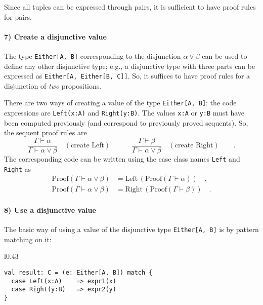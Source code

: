 Since all tuples can be expressed through pairs, it is sufficient
to have proof rules for pairs.

\paragraph{7) Create a disjunctive value}

The type \lstinline!Either[A, B]! corresponding to the disjunction
$\alpha\vee\beta$ can be used to define any other disjunctive type;
e.g., a disjunctive type with three parts can be expressed as \lstinline!Either[A, Either[B, C]]!.
So, it suffices to have proof rules for a disjunction of \emph{two}
propositions.

There are two ways of creating a value of the type \lstinline!Either[A, B]!:
the code expressions are \lstinline!Left(x:A)! and \lstinline!Right(y:B)!.
The values \lstinline!x:A! or \lstinline!y:B! must have been computed
previously (and correspond to previously proved sequents). So, the
sequent proof rules are
\[
\frac{\Gamma\vdash\alpha}{\Gamma\vdash\alpha\vee\beta}\quad(\text{create Left})\quad\quad\quad\frac{\Gamma\vdash\beta}{\Gamma\vdash\alpha\vee\beta}\quad(\text{create Right})\quad\quad.
\]
The corresponding code can be written using the case class names \lstinline!Left!
and \lstinline!Right! as 
\begin{align*}
\text{Proof}\left(\Gamma\vdash\alpha\vee\beta\right) & =\text{Left}\,(\text{Proof}\left(\Gamma\vdash\alpha\right))\quad,\\
\text{Proof}\left(\Gamma\vdash\alpha\vee\beta\right) & =\text{Right}\,(\text{Proof}\left(\Gamma\vdash\beta\right))\quad.
\end{align*}


\paragraph{8) Use a disjunctive value}

The basic way of using a value of the disjunctive type \lstinline!Either[A, B]!
is by pattern matching on it:

\begin{wrapfigure}{l}{0.43\columnwidth}%
\vspace{-0.6\baselineskip}
\begin{lstlisting}
val result: C = (e: Either[A, B]) match {
  case Left(x:A)    => expr1(x)
  case Right(y:B)   => expr2(y)
}
\end{lstlisting}

\vspace{-0.9\baselineskip}
\end{wrapfigure}%

